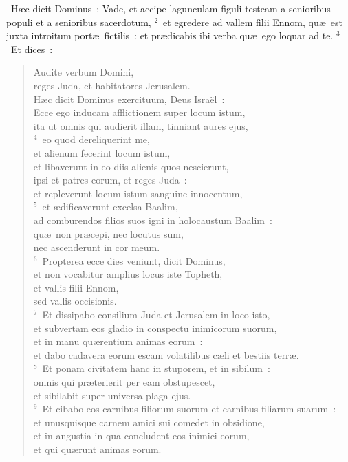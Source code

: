 ~\lettrine[lines=10,image=true,loversize=0.05,lraise=-0.03]{H}{}\ae c dicit Dominus~: Vade, et accipe lagunculam figuli testeam a senioribus populi et a senioribus sacerdotum,
${}^{2}$~et egredere ad vallem filii Ennom, qu\ae\ est juxta introitum port\ae\ fictilis~: et pr\ae dicabis ibi verba qu\ae\ ego loquar ad te.
${}^{3}$~Et dices~: \begin{flushleft}\begin{verse}Audite verbum Domini,\\ reges Juda, et habitatores Jerusalem.\\ H\ae c dicit Dominus exercituum, Deus Isra\"el~:\\ Ecce ego inducam afflictionem super locum istum,\\ ita ut omnis qui audierit illam, tinniant aures ejus,\\
${}^{4}$~eo quod dereliquerint me,\\ et alienum fecerint locum istum,\\ et libaverunt in eo diis alienis quos nescierunt,\\ ipsi et patres eorum, et reges Juda~:\\ et repleverunt locum istum sanguine innocentum,\\
${}^{5}$~et \ae dificaverunt excelsa Baalim,\\ ad comburendos filios suos igni in holocaustum Baalim~:\\ qu\ae\ non pr\ae cepi, nec locutus sum,\\ nec ascenderunt in cor meum.\\
${}^{6}$~Propterea ecce dies veniunt, dicit Dominus,\\ et non vocabitur amplius locus iste Topheth,\\ et vallis filii Ennom,\\ sed vallis occisionis.\\
${}^{7}$~Et dissipabo consilium Juda et Jerusalem in loco isto,\\ et subvertam eos gladio in conspectu inimicorum suorum,\\ et in manu qu\ae rentium animas eorum~:\\ et dabo cadavera eorum escam volatilibus c\ae li et bestiis terr\ae .\\
${}^{8}$~Et ponam civitatem hanc in stuporem, et in sibilum~:\\ omnis qui pr\ae terierit per eam obstupescet,\\ et sibilabit super universa plaga ejus.\\
${}^{9}$~Et cibabo eos carnibus filiorum suorum et carnibus filiarum suarum~:\\ et unusquisque carnem amici sui comedet in obsidione,\\ et in angustia in qua concludent eos inimici eorum,\\ et qui qu\ae runt animas eorum.\end{verse}\end{flushleft}


